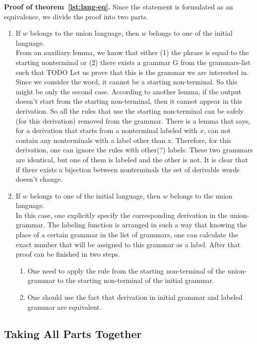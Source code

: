 \textbf{Proof of theorem~\ref{lst:lang-eq}.} Since the statement is formulated as an equivalence, we divide the proof into two parts.
\begin{enumerate}
\item If $w$ belongs to the union language, then $w$ belongs to one of the initial language. \\
From an auxiliary lemma, we know that either (1) the phrase is equal to the starting nonterminal or (2) there exists a grammar G from the grammars-list such that TODO
Let us prove that this is the grammar we are interested in.
Since we consider the word, it cannot be a starting non-terminal. So this might be only the second case.
According to another lemma, if the output doesn't start from the starting non-terminal, then it cannot appear in this derivation. So all the rules that use the starting non-terminal can be safely (for this derivation) removed from the grammar.
There is a lemma that says, for a derivation that starts from a nonterminal labeled with $x$, can not contain any nonterminals with a label other than x. Therefore, for this derivation, one can ignore the rules with other(?) labels.
These two grammars are identical, but one of them is labeled and the other is not. It is clear that if there exists a bijection between nonterminals the set of derivable words doesn't change.

\item If $w$ belongs to one of the initial language, then $w$ belongs to the union language. \\
In this case, one explicitly specify the corresponding derivation in the union-grammar.
The labeling function is arranged in such a way that knowing the place of a certain grammar in the list of grammars, one can calculate the exact number that will be assigned to this grammar as a label.
After that proof can be finished in two steps. 
\begin{enumerate}
\item One need to apply the rule from the starting non-terminal of the union-grammar to the starting non-terminal of the initial grammar. 
\item One should use the fact that derivation in initial grammar and labeled grammar are equivalent.
\end{enumerate}
\end{enumerate}

\subsection{Taking All Parts Together}

